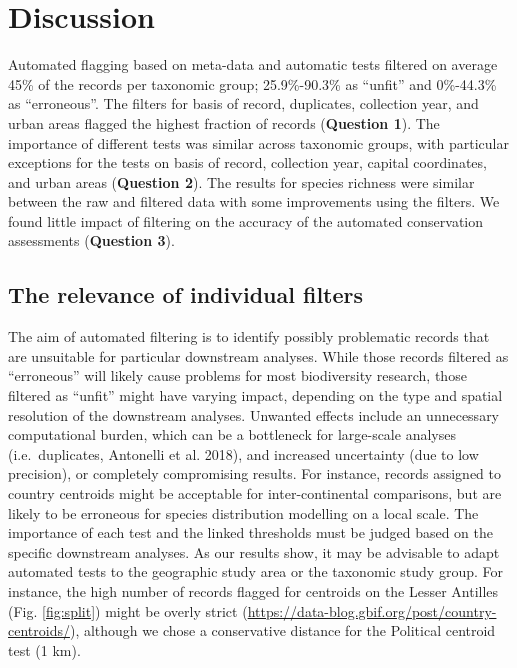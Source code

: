 \documentclass[fleqn,10pt,lineno]{wlpeerj} %
\begin{document}
\hypertarget{discussion}{%
\section*{Discussion}\label{discussion}}

Automated flagging based on meta-data and automatic tests filtered on average 45\% of the records per taxonomic group; 25.9\%-90.3\% as ``unfit'' and 0\%-44.3\% as ``erroneous''. The filters for basis of record, duplicates, collection year, and urban areas flagged the highest fraction of records (\textbf{Question 1}). The importance of different tests was similar across taxonomic groups, with particular exceptions for the tests on basis of record, collection year, capital coordinates, and urban areas (\textbf{Question 2}). The results for species richness were similar between the raw and filtered data with some improvements using the filters. We found little impact of filtering on the accuracy of the automated conservation assessments (\textbf{Question 3}).

\hypertarget{the-relevance-of-individual-filters}{%
\subsection*{The relevance of individual filters}\label{the-relevance-of-individual-filters}}

The aim of automated filtering is to identify possibly problematic records that are unsuitable for particular downstream analyses. While those records filtered as ``erroneous'' will likely cause problems for most biodiversity research, those filtered as ``unfit'' might have varying impact, depending on the type and spatial resolution of the downstream analyses. Unwanted effects include an unnecessary computational burden, which can be a bottleneck for large-scale analyses (i.e.~duplicates, Antonelli et al. 2018), and increased uncertainty (due to low precision), or completely compromising results. For instance, records assigned to country centroids might be acceptable for inter-continental comparisons, but are likely to be erroneous for species distribution modelling on a local scale. The importance of each test and the linked thresholds must be judged based on the specific downstream analyses. As our results show, it may be advisable to adapt automated tests to the geographic study area or the taxonomic study group. For instance, the high number of records flagged for centroids on the Lesser Antilles (Fig. \ref{fig:split}) might be overly strict (\url{https://data-blog.gbif.org/post/country-centroids/}), although we chose a conservative distance for the Political centroid test (1 km).
\end{document}
